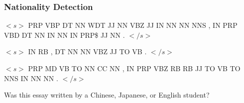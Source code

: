 \documentclass[handouti]{beamer}
\begin{document}
\begin{frame}
    \frametitle{Nationality Detection}

    {\small
    $<s>$ PRP VBP DT NN WDT JJ NN VBZ JJ IN NN NN NNS , IN PRP VBD DT NN IN NN IN
    PRP\$ JJ NN . $</s>$

    \vspace{.3in}
    $<s>$ IN RB , DT NN NN VBZ JJ TO VB . $</s>$

    \vspace{.3in}
    $<s>$ PRP MD VB TO NN CC NN , IN PRP VBZ RB RB JJ TO VB TO NNS IN NN NN .
    $</s>$
    }

    \vspace{.3in}
    \begin{center}
    {\normalsize Was this essay written by a Chinese, Japanese, or English
    student?}
    \end{center}
\end{frame}
\end{document}
